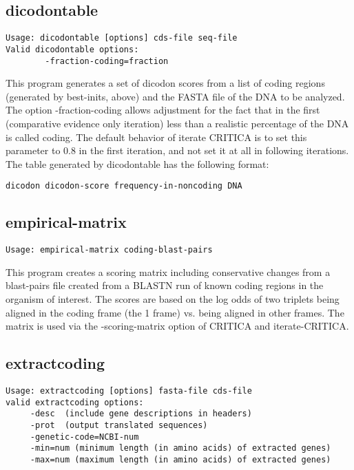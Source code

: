 \documentclass{article}
\begin{document}
\subsection{dicodontable}

\begin{verbatim}
Usage: dicodontable [options] cds-file seq-file
Valid dicodontable options:
        -fraction-coding=fraction
\end{verbatim}

This program generates a set of dicodon scores from a list of coding
regions (generated by best-inits, above) and the FASTA file of
the DNA to be analyzed. The option -fraction-coding allows
adjustment for the fact that in the first (comparative evidence only
iteration) less than a realistic percentage of the DNA is called
coding. The default behavior of iterate CRITICA is to set this
parameter to 0.8 in the first iteration, and not set it at all in
following iterations. The table generated by dicodontable has the
following format:

\begin{verbatim}
dicodon dicodon-score frequency-in-noncoding DNA
\end{verbatim}

\subsection{empirical-matrix}

\begin{verbatim}
Usage: empirical-matrix coding-blast-pairs
\end{verbatim}

This program creates a scoring matrix including conservative changes
from a blast-pairs file created from a BLASTN run of known coding
regions in the organism of interest. The scores are based on the log
odds of two triplets being aligned in the coding frame (the 1 frame)
vs. being aligned in other frames. The matrix is used via the
-scoring-matrix option of CRITICA and
iterate-CRITICA.

\subsection{extractcoding}

\begin{verbatim}
Usage: extractcoding [options] fasta-file cds-file
valid extractcoding options:
     -desc  (include gene descriptions in headers)
     -prot  (output translated sequences)
     -genetic-code=NCBI-num
     -min=num (minimum length (in amino acids) of extracted genes)
     -max=num (maximum length (in amino acids) of extracted genes)
\end{verbatim}
\end{document}
